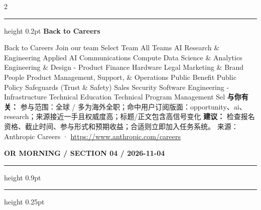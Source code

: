 \documentclass[10.5pt]{ctexart}
\begin{document}
\begin{multicols}{2}
\vspace{2mm}
\hrule height 0.2pt
\vspace{2mm}
{\large\bfseries Back to Careers}\par
Back to Careers Join our team Select Team All Teams AI Research \& Engineering Applied AI Communications Compute Data Science \& Analytics Engineering \& Design - Product Finance Hardware Legal Marketing \& Brand People Product Management, Support, \& Operations Public Benefit Public Policy Safeguards (Trust \& Safety) Sales Security Software Engineering - Infrastructure Technical Education Technical Program Management Sel
\textbf{与你有关：} 参与范围：全球 / 多为海外全职；命中用户订阅版面：opportunity、ai、research；来源接近一手且权威度高；标题/正文包含高信号变化
\textbf{建议：} 检查报名资格、截止时间、参与形式和预期收益；合适则立即加入任务系统。
{\footnotesize\color{ormuted} 来源：Anthropic Careers · \url{https://www.anthropic.com/careers}}
\end{multicols}
\newpage
{\small\bfseries OR MORNING / SECTION 04 / 2026-11-04}
\vspace{2mm}
\hrule height 0.9pt
\vspace{1.5mm}
\hrule height 0.25pt
\vspace{4mm}
\end{document}
